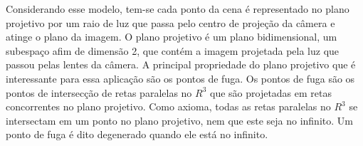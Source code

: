 \documentclass[12pt]{article}
\newtheorem{axiom}{Axioma}
\begin{document}
Considerando esse modelo, tem-se cada ponto da cena é representado no plano projetivo por um raio de luz que passa pelo centro de projeção da câmera e atinge o plano da imagem. O plano projetivo é um plano bidimensional, um subespaço afim de dimensão 2, que contém a imagem projetada pela luz que passou pelas lentes da câmera. A principal propriedade do plano projetivo que é interessante para essa aplicação são os pontos de fuga. Os pontos de fuga são os pontos de intersecção de retas paralelas no $R^3$ que são projetadas em retas concorrentes no plano projetivo. Como axioma, todas as retas paralelas no $R^3$ se intersectam em um ponto no plano projetivo, nem que este seja no infinito. Um ponto de fuga é dito degenerado quando ele está no infinito.













\end{document}
